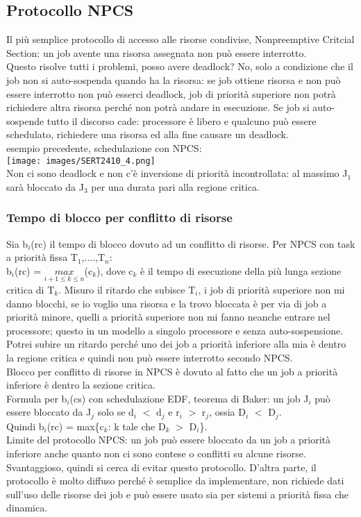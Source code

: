 \documentclass[18px]{article}
\begin{document}
\subsection{Protocollo NPCS}
Il più semplice protocollo di accesso alle risorse condivise, Nonpreemptive Critcial Section: un job avente una risorsa assegnata non può essere interrotto.\\ Questo risolve tutti i problemi, posso avere deadlock? No, solo a condizione che il job non si auto-sospenda quando ha la risorsa: se job ottiene risorsa e non può essere interrotto non può esserci deadlock, job di priorità superiore non potrà richiedere altra risorsa perché non potrà andare in esecuzione. Se job si auto-sospende tutto il discorso cade: processore è libero e qualcuno può essere schedulato, richiedere una risorsa ed alla fine causare un deadlock.\\ esempio precedente,  schedulazione con NPCS:\\
\texttt{[image: images/SERT2410\_4.png]}\\
Non ci sono deadlock e non c'è inversione di priorità incontrollata: al massimo J$_{1}$ sarà bloccato da J$_{3}$ per una durata pari alla regione critica.
\subsubsection{Tempo di blocco per conflitto di risorse}
Sia b$_{i}$(rc) il tempo di blocco dovuto ad un conflitto di risorse. Per NPCS con task a priorità fissa T$_{1}$,....,T$_{n}$:\\
b$_{i}$(rc) = $\underset{i+1 \leq k \leq n}{max}$(c$_{k}$), dove c$_{k}$ è il tempo di esecuzione della più lunga sezione critica di T$_{k}$. Misuro il ritardo che subisce T$_{i}$, i job di priorità superiore non mi danno blocchi, se io voglio una risorsa e la trovo bloccata è per via di job a priorità minore, quelli a priorità superiore non mi fanno neanche entrare nel processore; questo in un modello a singolo processore e senza auto-sospensione.\\ Potrei subire un ritardo perché uno dei job a priorità inferiore alla mia è dentro la regione critica e quindi non può essere interrotto secondo NPCS.\\ Blocco per conflitto di risorse in NPCS è dovuto al fatto che un job a priorità inferiore è dentro la sezione critica.\\ Formula per b$_{i}$(cs) con schedulazione EDF, teorema di Baker: un job J$_{i}$ può essere bloccato da J$_{j}$ solo se d$_{i}$ $<$ d$_{j}$ e r$_{i}$ $>$ r$_{j}$, ossia D$_{i}$ $<$ D$_{j}$.\\ Quindi b$_{i}$(rc) = max\{c$_{k}$: k tale che D$_{k}$ $>$ D$_{i}$\}.\\ Limite del protocollo NPCS: un job può essere bloccato da un job a priorità inferiore anche quanto non ci sono contese o conflitti su alcune risorse. Svantaggioso, quindi si cerca di evitar questo protocollo. D'altra parte, il protocollo è molto diffuso perché è semplice da implementare, non richiede dati sull'uso delle risorse dei job e può essere usato sia per sistemi a priorità fissa che dinamica.
\end{document}

